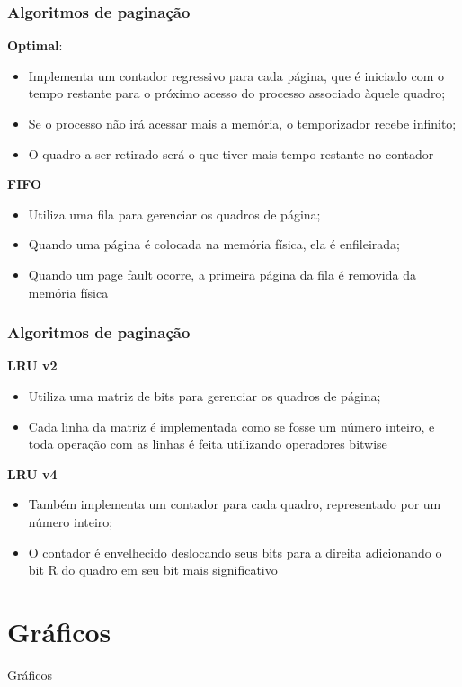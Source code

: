 \documentclass{beamer}
\begin{document}
\begin{frame}
\frametitle{Algoritmos de paginação}
\textbf{Optimal}:
\begin{itemize}
\item Implementa um contador regressivo para cada página, que é iniciado com o tempo restante para o próximo acesso do processo associado àquele quadro;
\item Se o processo não irá acessar mais a memória, o temporizador recebe infinito;
\item O quadro a ser retirado será o que tiver mais tempo restante no contador
\end{itemize}
\textbf{FIFO}
\begin{itemize}
\item Utiliza uma fila para gerenciar os quadros de página;
\item Quando uma página é colocada na memória física, ela é enfileirada;
\item Quando um page fault ocorre, a primeira página da fila é removida da memória física
\end{itemize}
\end{frame}

\begin{frame}
\frametitle{Algoritmos de paginação}
\textbf{LRU v2}
\begin{itemize}
\item Utiliza uma matriz de bits para gerenciar os quadros de página;
\item Cada linha da matriz é implementada como se fosse um número inteiro, e toda operação com as linhas é feita utilizando operadores bitwise
\end{itemize}
\textbf{LRU v4}
\begin{itemize}
\item Também implementa um contador para cada quadro, representado por um número inteiro;
\item O contador é envelhecido deslocando seus bits para a direita adicionando o bit R do quadro em seu bit mais significativo
\end{itemize}
\end{frame}

\section{Gráficos}

\begin{frame}
\begin{center}
\huge Gráficos
\end{center}
\end{frame}
\end{document}
